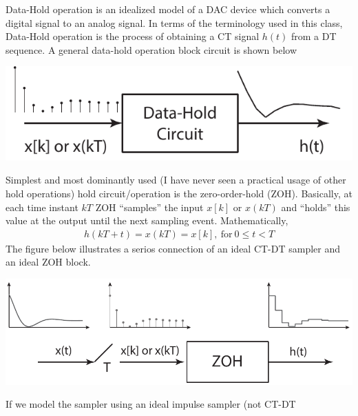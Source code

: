 \documentclass[twoside]{article}
\begin{document}
Data-Hold operation is an idealized model of
a DAC device which converts a digital signal 
to an analog signal. In terms of the terminology used 
in this class, Data-Hold operation is the process of 
obtaining a CT signal $h(t)$ from a DT sequence.
A general data-hold operation block circuit is shown 
below
%
    \begin{center}
\begin{minipage}[h]{0.5\linewidth}
    \begin{center}
      \includegraphics[width=\textwidth]{holdgeneral}
    \end{center}
\end{minipage}
    \end{center}
%
Simplest and most dominantly used (I have never seen a practical
usage of other hold operations) hold circuit/operation is 
the zero-order-hold (ZOH). Basically, at each time instant $k T$
ZOH ``samples'' the input $x[k]$ or $x(kT)$ and ``holds'' this value 
at the output until the next sampling event. Mathematically, 
%
\begin{align*}
  h(kT + t) = x(kT) = x[k], \ \mathrm{for} \ 0 \leq t < T 
\end{align*}
%
The figure below illustrates a serios connection of an ideal
CT-DT sampler and an ideal ZOH block. 
%
    \begin{center}
\begin{minipage}[h]{0.7\linewidth}
    \begin{center}
      \includegraphics[width=\textwidth]{zoh1}
    \end{center}
\end{minipage}
    \end{center}
%
If we model the sampler using an ideal impulse sampler (not CT-DT
\end{document}
